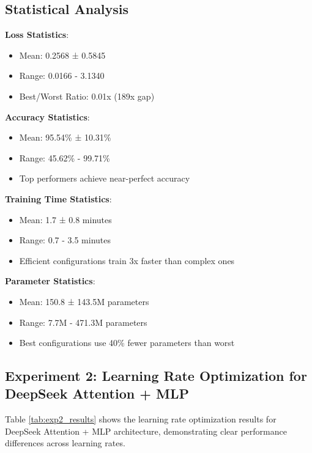 \documentclass[11pt,a4paper]{article}
\begin{document}
\subsection{Statistical Analysis}

\textbf{Loss Statistics}:
\begin{itemize}
    \item Mean: 0.2568 ± 0.5845
    \item Range: 0.0166 - 3.1340
    \item Best/Worst Ratio: 0.01x (189x gap)
\end{itemize}

\textbf{Accuracy Statistics}:
\begin{itemize}
    \item Mean: 95.54\% ± 10.31\%
    \item Range: 45.62\% - 99.71\%
    \item Top performers achieve near-perfect accuracy
\end{itemize}

\textbf{Training Time Statistics}:
\begin{itemize}
    \item Mean: 1.7 ± 0.8 minutes
    \item Range: 0.7 - 3.5 minutes
    \item Efficient configurations train 3x faster than complex ones
\end{itemize}

\textbf{Parameter Statistics}:
\begin{itemize}
    \item Mean: 150.8 ± 143.5M parameters
    \item Range: 7.7M - 471.3M parameters
    \item Best configurations use 40\% fewer parameters than worst
\end{itemize}

\subsection{Experiment 2: Learning Rate Optimization for DeepSeek Attention + MLP}

Table \ref{tab:exp2_results} shows the learning rate optimization results for DeepSeek Attention + MLP architecture, demonstrating clear performance differences across learning rates.
\end{document}
